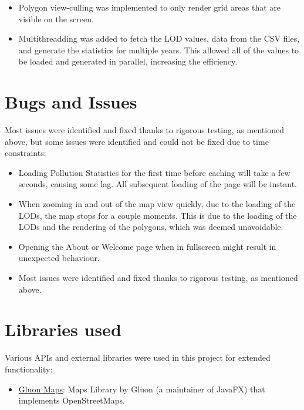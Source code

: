 \documentclass[10pt, a4paper]{scrartcl}
\begin{document}
\begin{multicols}{2}
\begin{itemize}
    \item Polygon view-culling was implemented to only render grid areas that are visible on the screen.
    
    \item Multithreadding was added to fetch the LOD values, data from the CSV files, and generate the statistics for
    multiple years. This allowed all of the values to be loaded and generated in parallel, increasing the efficiency.
\end{itemize}

\section{Bugs and Issues}

Most issues were identified and fixed thanks to rigorous testing, as mentioned above, but some issues were identified
and could not be fixed due to time constraints:

\begin{itemize}
    \itemsep-0.3em
    \item Loading Pollution Statistics for the first time before caching will take a few seconds, causing some lag. All
    subsequent loading of the page will be instant.
    
    \item When zooming in and out of the map view quickly, due to the loading of the LODs, the map stops for a couple
    moments. This is due to the loading of the LODs and the rendering of the polygons, which was deemed unavoidable.

    \item Opening the About or Welcome page when in fullscreen might result in unexpected behaviour.
        
    \item Most issues were identified and fixed thanks to rigorous testing, as mentioned above.
\end{itemize}

\section{Libraries used}

\noindent Various APIs and external libraries were used in this project for extended functionality:

\begin{itemize}
    \itemsep-0.3em
    \item \href{https://github.com/gluonhq/maps}{Gluon Maps}: Maps Library by Gluon (a maintainer of JavaFX) that implements
    OpenStreetMaps.


\end{itemize}
\end{multicols}
\end{document}
